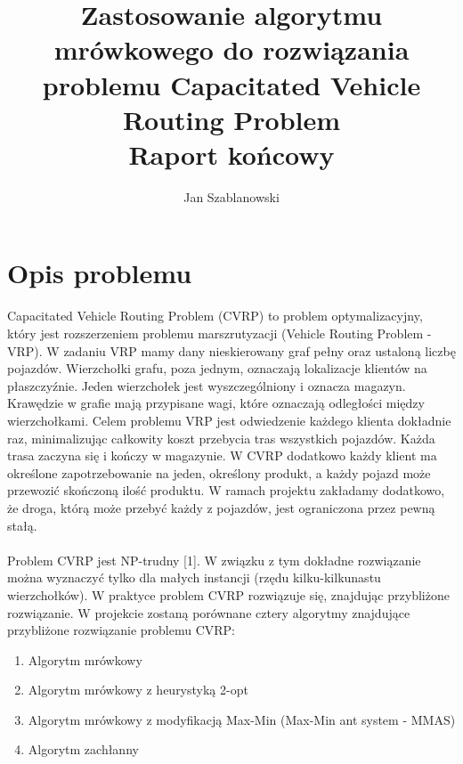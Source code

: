 \documentclass{article}
\title{Zastosowanie algorytmu mrówkowego do rozwiązania problemu Capacitated Vehicle Routing Problem \\ \large{Raport końcowy}}
\author{Jan Szablanowski}
\begin{document}
\date{}
\maketitle

\vspace{2cm}
\hypersetup{
    linkcolor=black,
    citecolor=black,
    urlcolor=black
}

\abstract{}



\section{Opis problemu}

Capacitated Vehicle Routing Problem (CVRP) to problem optymalizacyjny, który jest rozszerzeniem problemu marszrutyzacji (Vehicle Routing Problem - VRP). W zadaniu VRP mamy dany nieskierowany graf pełny oraz ustaloną liczbę pojazdów. Wierzchołki grafu, poza jednym, oznaczają lokalizacje klientów na płaszczyźnie. Jeden wierzchołek jest wyszczególniony i oznacza magazyn. Krawędzie w grafie mają przypisane wagi, które oznaczają odległości między wierzchołkami. Celem problemu VRP jest odwiedzenie każdego klienta dokładnie raz, minimalizując całkowity koszt przebycia tras wszystkich pojazdów. Każda trasa zaczyna się i kończy w magazynie. W CVRP dodatkowo każdy klient ma określone zapotrzebowanie na jeden, określony produkt, a każdy pojazd może przewozić skończoną ilość produktu. W ramach projektu zakładamy dodatkowo, że droga, którą może przebyć każdy z pojazdów, jest ograniczona przez pewną stałą.
\\ \\
Problem CVRP jest NP-trudny [1]. W związku z tym dokładne rozwiązanie można wyznaczyć tylko dla małych instancji (rzędu kilku-kilkunastu wierzchołków). W praktyce problem CVRP rozwiązuje się, znajdując przybliżone rozwiązanie. W projekcie zostaną porównane cztery algorytmy znajdujące przybliżone rozwiązanie problemu CVRP:
\begin{enumerate}
    \item Algorytm mrówkowy
    \item Algorytm mrówkowy z heurystyką 2-opt
    \item Algorytm mrówkowy z modyfikacją Max-Min (Max-Min ant system - MMAS)
    \item Algorytm zachłanny
\end{enumerate}
\end{document}
